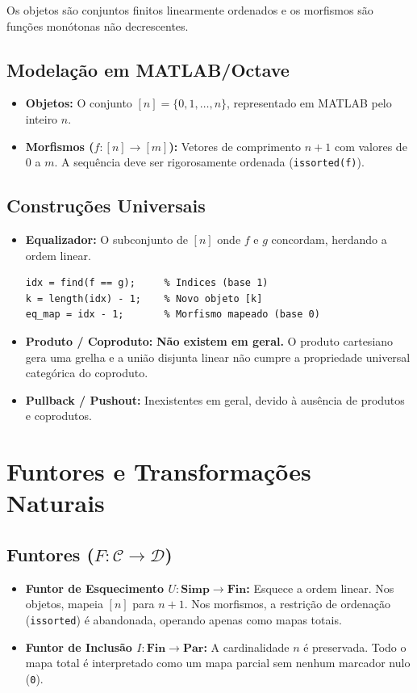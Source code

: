 \documentclass[11pt,a4paper]{article}
\begin{document}
Os objetos são conjuntos finitos linearmente ordenados e os morfismos são funções monótonas não decrescentes.

\subsection{Modelação em MATLAB/Octave}
\begin{itemize}
    \item \textbf{Objetos:} O conjunto $[n] = \{0, 1, \dots, n\}$, representado em MATLAB pelo inteiro $n$.
    \item \textbf{Morfismos ($f: [n] \to [m]$):} Vetores de comprimento $n + 1$ com valores de $0$ a $m$. A sequência deve ser rigorosamente ordenada (\texttt{issorted(f)}).
\end{itemize}

\subsection{Construções Universais}
\begin{itemize}
    \item \textbf{Equalizador:} O subconjunto de $[n]$ onde $f$ e $g$ concordam, herdando a ordem linear.
\begin{lstlisting}
idx = find(f == g);     % Indices (base 1)
k = length(idx) - 1;    % Novo objeto [k]
eq_map = idx - 1;       % Morfismo mapeado (base 0)
\end{lstlisting}
    \item \textbf{Produto / Coproduto:} \textbf{Não existem em geral.} O produto cartesiano gera uma grelha e a união disjunta linear não cumpre a propriedade universal categórica do coproduto.
    \item \textbf{Pullback / Pushout:} Inexistentes em geral, devido à ausência de produtos e coprodutos.
\end{itemize}

\section{Funtores e Transformações Naturais}

\subsection{Funtores ($F: \mathcal{C} \to \mathcal{D}$)}
\begin{itemize}
    \item \textbf{Funtor de Esquecimento $U: \mathbf{Simp} \to \mathbf{Fin}$:} Esquece a ordem linear. Nos objetos, mapeia $[n]$ para $n + 1$. Nos morfismos, a restrição de ordenação (\texttt{issorted}) é abandonada, operando apenas como mapas totais.
    \item \textbf{Funtor de Inclusão $I: \mathbf{Fin} \to \mathbf{Par}$:} A cardinalidade $n$ é preservada. Todo o mapa total é interpretado como um mapa parcial sem nenhum marcador nulo (\texttt{0}).
\end{itemize}
\end{document}
